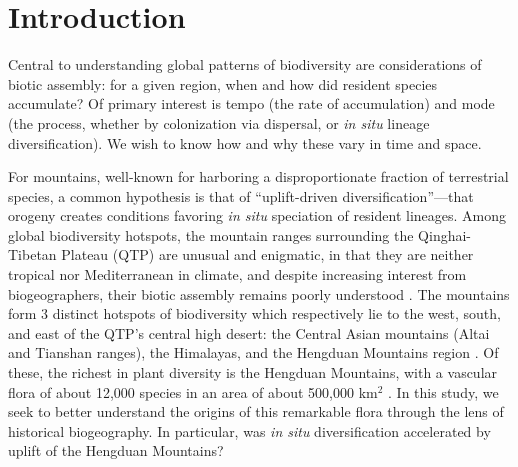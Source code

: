 \section{Introduction}


Central to understanding global patterns of biodiversity are considerations of biotic assembly: for a given region, when and how did resident species accumulate? Of primary interest is tempo (the rate of accumulation) and mode (the process, whether by colonization via dispersal, or \textit{in situ} lineage diversification). We wish to know how and why these vary in time and space.

For mountains, well-known for harboring a disproportionate fraction of terrestrial species, a common hypothesis is that of ``uplift-driven diversification''---that orogeny creates conditions favoring \textit{in situ} speciation of resident lineages. Among global biodiversity hotspots, the mountain ranges surrounding the Qinghai-Tibetan Plateau (QTP) are unusual and enigmatic, in that they are neither tropical nor Mediterranean in climate, and despite increasing interest from biogeographers, their biotic assembly remains poorly understood \citep{Favre2015,Wen2014,Hughes2015}. The mountains form 3 distinct hotspots of biodiversity which respectively lie to the west, south, and east of the QTP's central high desert: the Central Asian mountains (Altai and Tianshan ranges), the Himalayas, and the Hengduan Mountains region \citep{Favre2015}. Of these, the richest in plant diversity is the Hengduan Mountains, with a vascular flora of about 12,000 species in an area of about 500,000 km$^2$ \citep{Boufford2014,LiEtLi1993,Wu1988}. In this study, we seek to better understand the origins of this remarkable flora through the lens of historical biogeography. In particular, was \textit{in situ} diversification accelerated by uplift of the Hengduan Mountains?


